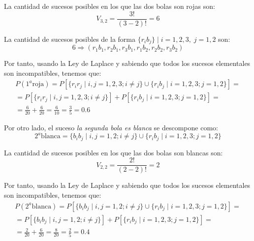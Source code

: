 \begin{ejercicio}
\begin{enumerate}
        La cantidad de sucesos posibles en los que las dos bolas son rojas son:
        \begin{equation*}
            V_{3,2}=\frac{3!}{(3-2)!}=6
        \end{equation*}

        La cantidad de sucesos posibles de la forma $\{r_ib_j\}\mid i=1,2,3,\;j=1,2$ son:
        \begin{equation*}
            6 \Longrightarrow  (r_1b_1,r_2b_1,r_3b_1, r_1b_2, r_2b_2,r_3b_2)
        \end{equation*}

        Por tanto, usando la Ley de Laplace y sabiendo que todos los sucesos elementales son incompatibles, tenemos que:
        \begin{multline*}
            P(1^a\text{roja})=P[\lbrace r_{i}r_{j}\mid i, j = 1, 2, 3; i \neq j \rbrace
            \cup
            \lbrace r_{i} b_{j}\mid i=1, 2, 3 ; j = 1, 2 \rbrace]
            =\\=
            P[\lbrace r_{i}r_{j}\mid i, j = 1, 2, 3; i \neq j \rbrace]
            +P[
            \lbrace r_{i} b_{j}\mid i=1, 2, 3 ; j = 1, 2 \rbrace]
            =\\=
            \frac{6}{20} + \frac{6}{20} = \frac{6}{10}=\frac{3}{5} = 0.6
        \end{multline*}

        \vspace{1cm}
        Por otro lado, el suceso \textit{la segunda bola es blanca} se descompone como:
        \begin{equation*}
            2^a\text{blanca}=\lbrace b_{i}b_{j}\mid i, j = 1, 2; i \neq j \rbrace
            \cup
            \lbrace r_{i} b_{j}\mid i=1, 2, 3 ; j = 1, 2 \rbrace
        \end{equation*}

        La cantidad de sucesos posibles en los que las dos bolas son blancas son:
        \begin{equation*}
            V_{2,2}=\frac{2!}{(2-2)!}=2
        \end{equation*}
        
        Por tanto, usando la Ley de Laplace y sabiendo que todos los sucesos elementales son incompatibles, tenemos que:
        \begin{multline*}
            P(2^a\text{blanca})=P[\lbrace b_{i}b_{j}\mid i, j = 1, 2; i \neq j \rbrace
            \cup
            \lbrace r_{i} b_{j}\mid i=1, 2, 3 ; j = 1, 2 \rbrace]
            =\\=
            P[\lbrace b_{i}b_{j}\mid i, j = 1, 2; i \neq j \rbrace]
            +P[
            \lbrace r_{i} b_{j}\mid i=1, 2, 3 ; j = 1, 2 \rbrace]
            =\\=
            \frac{2}{20} + \frac{6}{20} = \frac{8}{20}=\frac{2}{5} = 0.4
        \end{multline*}


\end{enumerate}
\end{ejercicio}
